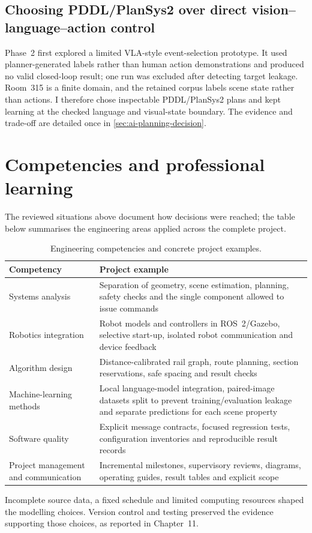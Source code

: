 \subsection{Choosing PDDL/PlanSys2 over direct vision--language--action control}

Phase~2 first explored a limited VLA-style event-selection prototype. It used
planner-generated labels rather than human action demonstrations and produced no
valid closed-loop result; one run was excluded after detecting target leakage.
Room~315 is a finite domain, and the retained corpus labels scene state rather
than actions. I therefore chose inspectable PDDL/PlanSys2 plans and kept learning
at the checked language and visual-state boundary. The evidence and trade-off
are detailed once in \cref{sec:ai-planning-decision}.

\section{Competencies and professional learning}

The reviewed situations above document how decisions were reached; the table
below summarises the engineering areas applied across the complete project.

\begin{table}[H]
\centering
\small
\renewcommand{\arraystretch}{1.05}
\caption{Engineering competencies and concrete project examples.}
\label{tab:competencies}
\begin{tabularx}{\textwidth}{@{}
>{\raggedright\arraybackslash}p{}
>{\raggedright\arraybackslash}X@{}}
\toprule
\textbf{Competency} & \textbf{Project example}\\
\midrule
Systems analysis & Separation of geometry, scene estimation, planning, safety
checks and the single component allowed to issue commands\\
\tablerowrule
Robotics integration & Robot models and controllers in ROS~2/Gazebo, selective
start-up, isolated robot communication and device feedback\\
\tablerowrule
Algorithm design & Distance-calibrated rail graph, route planning, section
reservations, safe spacing and result checks\\
\tablerowrule
Machine-learning methods & Local language-model integration,
paired-image datasets split to prevent training/evaluation leakage and separate
predictions for each scene property\\
\tablerowrule
Software quality & Explicit message contracts, focused regression tests,
configuration inventories and reproducible result records\\
\tablerowrule
Project management and communication & Incremental milestones, supervisory
reviews, diagrams, operating guides, result tables and explicit scope\\
\bottomrule
\end{tabularx}
\end{table}

Incomplete source data, a fixed schedule and limited computing resources shaped
the modelling choices. Version control and testing preserved the evidence
supporting those choices, as reported in Chapter~11.
